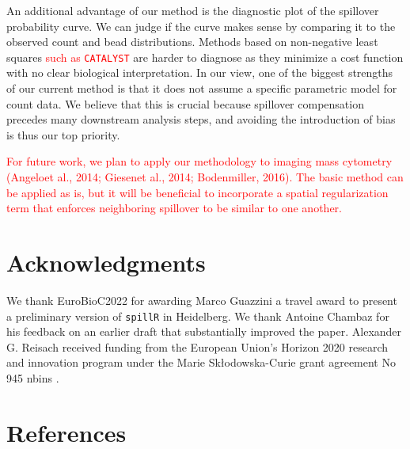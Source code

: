 \documentclass[
]{article}
\begin{document}
An additional advantage of our method is the diagnostic plot of the spillover probability curve. We can judge if the curve makes sense by comparing it to the observed count and bead distributions. Methods based on non-negative least squares \textcolor{red}{such as \texttt{CATALYST}} are harder to diagnose as they minimize a cost function with no clear biological interpretation. In our view, one of the biggest strengths of our current method is that it does not assume a specific parametric model for count data. We believe that this is crucial because spillover compensation precedes many downstream analysis steps, and avoiding the introduction of bias is thus our top priority.

\textcolor{red}{
For future work, we plan to apply our methodology to imaging mass cytometry (Angeloet al., 2014; Giesenet al., 2014; Bodenmiller, 2016). The basic method can be applied as is, but it will be beneficial to incorporate a spatial regularization term that enforces neighboring spillover to be similar to one another.
}

\section*{Acknowledgments}\label{acknowledgments}

We thank EuroBioC2022 for awarding Marco Guazzini a travel award to present a preliminary version of \texttt{spillR} in Heidelberg. We thank Antoine Chambaz for his feedback on an earlier draft that substantially improved the paper. Alexander G. Reisach received funding from the European Union's Horizon 2020 research and innovation program under the Marie Sk\l{}odowska-Curie grant agreement No 945 nbins \euflag.

\section*{References}\label{references}
\end{document}
